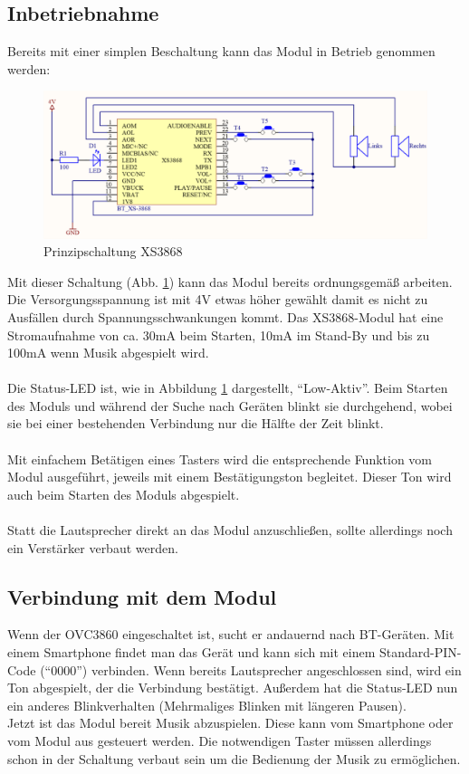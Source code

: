 \subsection{Inbetriebnahme} \label{subsec:4.1.6}
Bereits mit einer simplen Beschaltung kann das Modul in Betrieb genommen werden:
\begin{figure} [H]
	\centering
	\includegraphics[width=1\textwidth]{img/BTModul/XS3868_Prinzipschaltung.png}
	\caption{Prinzipschaltung XS3868}\label {fig:4.1.6.1}
\end{figure} 
Mit dieser Schaltung (Abb. \ref {fig:4.1.6.1}) kann das Modul bereits ordnungsgemäß arbeiten.\\
Die Versorgungsspannung ist mit 4V etwas höher gewählt damit es nicht zu Ausfällen durch Spannungsschwankungen kommt. Das XS3868-Modul hat eine Stromaufnahme von ca. 30mA beim Starten, 10mA im Stand-By und bis zu 100mA wenn Musik abgespielt wird.\\ \\
Die Status-LED ist, wie in Abbildung \ref {fig:4.1.6.1} dargestellt, \enquote{Low-Aktiv}. Beim Starten des Moduls und während der Suche nach Geräten blinkt sie durchgehend, wobei sie bei einer bestehenden Verbindung nur die Hälfte der Zeit blinkt.\\ \\
Mit einfachem Betätigen eines Tasters wird die entsprechende Funktion vom Modul ausgeführt, jeweils mit einem Bestätigungston begleitet. Dieser Ton wird auch beim Starten des Moduls abgespielt.\\ \\
Statt die Lautsprecher direkt an das Modul anzuschließen, sollte allerdings noch ein Verstärker verbaut werden.
\newpage


\subsection{Verbindung mit dem Modul} \label{subsec:4.1.7}
Wenn der OVC3860 eingeschaltet ist, sucht er andauernd nach BT-Geräten. Mit einem Smartphone findet man das Gerät und kann sich mit einem Standard-PIN-Code (\enquote{0000}) verbinden. Wenn bereits Lautsprecher angeschlossen sind, wird ein Ton abgespielt, der die Verbindung bestätigt. Außerdem hat die Status-LED nun ein anderes Blinkverhalten (Mehrmaliges Blinken mit längeren Pausen).\\
Jetzt ist das Modul bereit Musik abzuspielen. Diese kann vom Smartphone oder vom Modul aus gesteuert werden. Die notwendigen Taster müssen allerdings schon in der Schaltung verbaut sein um die Bedienung der Musik zu ermöglichen.


